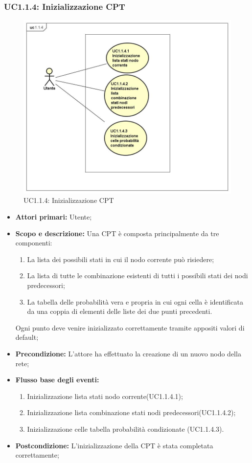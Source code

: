 \subsubsection{UC1.1.4: Inizializzazione CPT} 
\begin{figure} [H]
	\centering
	\includegraphics[scale=0.45]{Img/UC1-1-4} 
	\caption{UC1.1.4: Inizializzazione CPT} \label{} 
\end{figure} 
\begin{itemize} 
	\item{\textbf{Attori primari:} Utente;} 
	\item{\textbf{Scopo e descrizione:} Una CPT è composta principalmente da tre componenti: 
		\begin{enumerate} 
			\item{La lista dei possibili stati in cui il nodo corrente può risiedere;} 
			\item{La lista di tutte le combinazione esistenti di tutti i possibili stati dei nodi predecessori;} 
			\item{La tabella delle probabilità vera e propria in cui ogni cella è identificata da una coppia di elementi delle liste dei due punti precedenti.} 
		\end{enumerate} 			
		Ogni punto deve venire inizializzato correttamente tramite appositi valori di default;
	} 
	\item{\textbf{Precondizione:} L'attore ha effettuato la creazione di un nuovo nodo della rete;} 
	\item{\textbf{Flusso base degli eventi:} } 
	\begin{enumerate} 
		\item{Inizializzazione lista stati nodo corrente(UC1.1.4.1);} 
		\item{Inizializzazione lista combinazione stati nodi predecessori(UC1.1.4.2);} 
		\item{Inizializzazione celle tabella probabilità condizionate (UC1.1.4.3).} 
	\end{enumerate} 
	\item{\textbf{Postcondizione:} L'inizializzazione della CPT è stata completata correttamente;} 
\end{itemize} 
